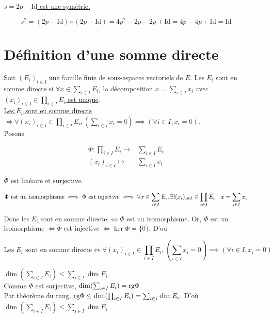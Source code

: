 \documentclass[]{article}
\begin{document}
\underline{$s = 2p - \text{Id}$ est une symétrie.} 

\[ s^2 = (2p - \text{Id})\circ(2p - \text{Id}) = 4p^2 - 2p - 2p + \text{Id} = 4p - 4p + \text{Id} = \text{Id} \]

\section{Définition d'une somme directe}

Soit $(E_i)_{i \in I}$ une famille finie de sous-espaces vectoriels de $E$. Les $E_i$ sont en somme directe si \underline{$\forall x \in \sum_{i \in I} E_i$, la décomposition $x = \sum_{i \in I} x_i$ avec $(x_i)_{i \in I} \in \prod_{i \in I} E_i$ est unique}. \\

\underline{Les $E_i$ sont en somme directe $\iff \forall (x_i)_{i \in I} \in \prod_{i \in I} E_i, (\sum_{i \in I} x_i = 0) \implies (\forall i \in I, x_i = 0)$}. \\

Posons 

\begin{align*}
    \Phi: \prod_{i \in I} E_i \rightarrow & \sum_{i \in I} E_i \\
    (x_i)_{i \in I} \mapsto & \sum_{i \in I} x_i
\end{align*}

$\Phi$ est linéaire et surjective.

\[ \Phi \text{ est un isomorphisme} \iff \Phi \text{ est injective} \iff \forall x \in \sum_{i \in I} E_i, \exists ! (x_i)_{i \in I} \in \prod_{i \in I} E_i \text{ } | \text{ } x = \sum_{i \in I} x_i\]

Donc les $E_i$ sont en somme directe $\iff \Phi $ est un isomorphisme. Or, $\Phi $ est un isomorphisme $\iff \Phi$ est injective $\iff \ker \Phi = \{0\}$. D'où

\[ \text{Les } E_i \text{ sont en somme directe} \iff \forall (x_i)_{i \in I} \in \prod_{i \in I} E_i, (\sum_{i \in I} x_i = 0) \implies (\forall i \in I, x_i = 0) \]

\underline{$\dim(\sum_{i \in I}E_i) \leq \sum_{i \in I} \dim E_i$} \\

Comme $\Phi$ est surjective, $\dim(\sum_{i \in I}E_i) = \text{rg} \Phi$. \\

Par théorème du rang, $\text{rg} \Phi \leq \dim (\prod_{i \in I} E_i) = \sum_{i \in I} \dim E_i$. D'où $\dim(\sum_{i \in I}E_i) \leq \sum_{i \in I} \dim E_i$ \\
\end{document}
